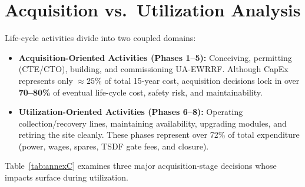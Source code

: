 \section{Acquisition vs.\ Utilization Analysis}
\label{sec:C}

Life-cycle activities divide into two coupled domains:
\begin{itemize}
    \item \textbf{Acquisition-Oriented Activities (Phases 1--5):} Conceiving, permitting (CTE/CTO), building, and commissioning UA-EWRRF. Although CapEx represents only $\approx 25\%$ of total 15-year cost, acquisition decisions lock in over \textbf{70--80\%} of eventual life-cycle cost, safety risk, and maintainability.
    \item \textbf{Utilization-Oriented Activities (Phases 6--8):} Operating collection/recovery lines, maintaining availability, upgrading modules, and retiring the site cleanly. These phases represent over 72\% of total expenditure (power, wages, spares, TSDF gate fees, and closure).
\end{itemize}

Table~\ref{tab:annexC} examines three major acquisition-stage decisions whose impacts surface during utilization.

